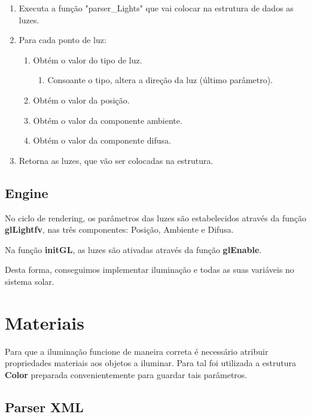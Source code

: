 \documentclass[a4paper]{article}
\begin{document}
\ttfamily
\begin{enumerate}
  \item Executa a função "parser\_Lights" que vai colocar na estrutura de dados as luzes.
  \item Para cada ponto de luz:
  \begin{enumerate}
    \item Obtém o valor do tipo de luz.
		\begin{enumerate}
			\item Consoante o tipo, altera a direção da luz (último parâmetro).
		\end{enumerate}
		\item Obtém o valor da posição.
		\item Obtém o valor da componente ambiente.
		\item Obtém o valor da componente difusa.
		\end{enumerate}
  	\item Retorna as luzes, que vão ser colocadas na estrutura.
\end{enumerate}
\rmfamily


\subsection{Engine}
\label{sec:enginei}

No ciclo de rendering, os parâmetros das luzes são estabelecidos através da função \textbf{glLightfv}, nas três componentes: Posição, Ambiente e Difusa.

Na função \textbf{initGL}, as luzes são ativadas através da função \textbf{glEnable}.

Desta forma, conseguimos implementar iluminação e todas as suas variáveis no sistema solar.

\newpage

\section{Materiais}
\label{sec:materiais}

Para que a iluminação funcione de maneira correta é necessário atribuir propriedades materiais aos objetos a iluminar. Para tal foi utilizada a estrutura \textbf{Color} preparada convenientemente para guardar tais parâmetros.

\subsection{Parser XML}
\label{sec:parserm}
\end{document}

